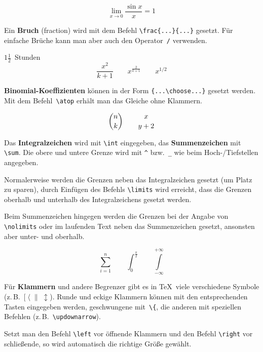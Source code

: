 \begin{LTXexample}
\[
\lim_{x \to 0} \frac{\sin x}{x}
=1
\]
\end{LTXexample}

Ein \textbf{Bruch} (fraction) wird mit dem Befehl
\lstinline|\frac{...}{...}| gesetzt.  Für einfache Brüche kann man
aber auch den Operator~\lstinline|/| verwenden.

\begin{LTXexample}
$1\frac{1}{2}$~Stunden
\[
\frac{ x^{2} }{ k+1 } \qquad
x^{ \frac{2}{k+1} } \qquad
x^{ 1/2 }
\]
\end{LTXexample}


\textbf{Binomial-Koeffizienten} können in der Form
\lstinline|{...\choose...}| gesetzt werden.
Mit dem Befehl~\lstinline|\atop| erhält man das Gleiche ohne
Klammern.

\begin{LTXexample}
\[
{ n \choose k } \qquad
{ x\atop y+2 }
\]
\end{LTXexample}


\medskip

Das \textbf{Integralzeichen} wird mit \lstinline|\int| eingegeben, das
\textbf{Summenzeichen} mit \lstinline|\sum|.
Die obere und untere Grenze wird mit \lstinline|^| bzw.~\lstinline|_| wie
beim \mbox{Hoch-}\slash Tiefstellen angegeben.

Normalerweise werden die Grenzen neben das Integralzeichen
gesetzt (um Platz zu sparen), durch Einfügen des Befehls
\lstinline|\limits| wird erreicht, dass die Grenzen oberhalb und
unterhalb des Integralzeichens gesetzt werden.

Beim Summenzeichen hingegen werden die Grenzen bei der Angabe von
\lstinline|\nolimits| oder im laufenden Text neben das Summenzeichen
gesetzt, ansonsten aber unter- und oberhalb.

\begin{LTXexample}
\[
\sum_{i=1}^{n} \qquad
\int_{0}^{\frac{\pi}{2}} \qquad
\int \limits_{-\infty}^{+\infty}
\]
\end{LTXexample}

Für \textbf{Klammern} und andere Begrenzer gibt es in \TeX\
viele verschiedene Symbole
(z.\,B.~\([\;\langle\;\|\;\updownarrow\)).
Runde und eckige Klammern können mit den entsprechenden Tasten
eingegeben werden, geschwungene mit~\lstinline|\{|, die anderen mit
speziellen Befehlen (z.\,B.~\lstinline|\updownarrow|).

Setzt man den Befehl \lstinline|\left| vor öffnende Klammern und den
Befehl \lstinline|\right| vor schließende, so wird automatisch die
richtige Größe gewählt.

